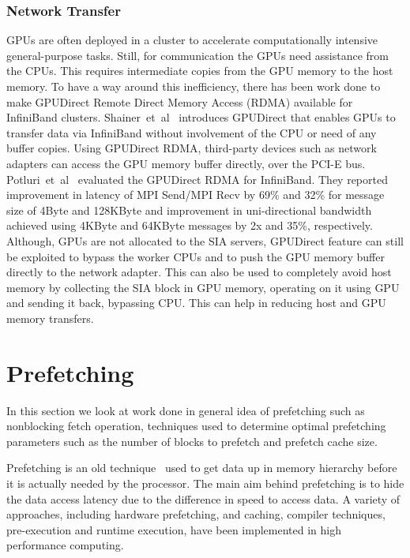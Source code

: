 \subsubsection{Network Transfer}
GPUs are often deployed in a cluster to accelerate computationally intensive
general-purpose tasks. Still, for communication the GPUs need assistance from the CPUs.
This requires intermediate copies from the GPU memory to the host memory. To have
a way around this inefficiency, there has been work done to make GPUDirect Remote
Direct Memory Access (RDMA) available for InfiniBand clusters. Shainer~et~al~\cite{Shainer2011} introduces
GPUDirect that enables GPUs to transfer data via InfiniBand without involvement
of the CPU or need of any buffer copies. Using GPUDirect RDMA, third-party devices such as
network adapters can access the GPU memory buffer directly, over the PCI-E bus.
Potluri~et~al~\cite{Potluri:2013:EIM:2570457.2571010} evaluated the GPUDirect RDMA for InfiniBand. They reported
improvement in latency of MPI Send/MPI Recv by 69\% and 32\% for message size of
4Byte and 128KByte and improvement in uni-directional bandwidth achieved using
4KByte and 64KByte messages by 2x and 35\%, respectively.
Although, GPUs are not allocated to the SIA servers, GPUDirect feature can still
be exploited to bypass the worker CPUs and to push the GPU memory buffer directly to the network
adapter. This can also be used to completely avoid host memory by collecting the
SIA block in GPU memory, operating on it using GPU and sending it back, bypassing
CPU. This can help in reducing host and GPU memory transfers.

\section{Prefetching}
In this section we look at work done in general idea of prefetching such as
nonblocking fetch operation, techniques used to determine optimal prefetching
parameters such as the number of blocks to prefetch and prefetch cache size.

Prefetching is an old technique~\cite{anacker68}\cite{Smith1982}\cite{Vanderwiel2000}
used to get data up in memory hierarchy before it is actually needed by the processor.
The main aim behind prefetching is to hide the data access latency due to the difference in speed to access
data. A variety of approaches, including hardware prefetching, and caching, compiler
techniques, pre-execution and runtime execution, have been implemented in
high performance computing.

